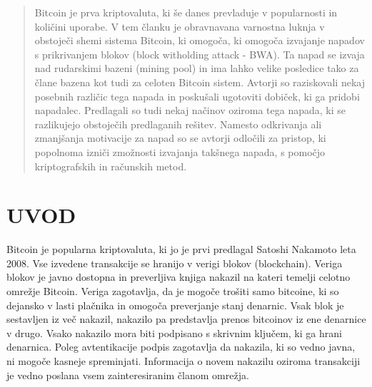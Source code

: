 \documentclass{acm_proc_article-sp}
\begin{document}
	\date{30 July 1999}
	
	\maketitle
\begin{abstract}

Bitcoin je prva kriptovaluta, ki še danes prevladuje v popularnosti in količini uporabe. V tem članku je obravnavana  varnostna luknja v obstoječi shemi sistema Bitcoin, ki omogoča, ki omogoča izvajanje napadov s prikrivanjem blokov (block witholding attack - BWA). Ta napad se izvaja nad rudarskimi bazeni (mining pool) in ima lahko velike posledice tako za člane bazena kot tudi za celoten Bitcoin sistem. Avtorji so raziskovali nekaj posebnih različic tega napada in poskušali ugotoviti dobiček, ki ga pridobi napadalec. Predlagali so tudi nekaj načinov oziroma tega napada, ki se razlikujejo obstoječih predlaganih rešitev.
Namesto odkrivanja ali zmanjšanja motivacije za napad so se avtorji odločili za pristop, ki popolnoma izniči zmožnosti izvajanja takšnega napada, s pomočjo kriptografskih in računskih metod.

\end{abstract}

\section{UVOD} \label{sekcija1}

Bitcoin je popularna kriptovaluta, ki jo je prvi predlagal Satoshi Nakamoto leta 2008. Vse izvedene transakcije se hranijo v verigi blokov (blockchain). Veriga blokov je javno dostopna in preverljiva knjiga nakazil na kateri temelji celotno omrežje Bitcoin. Veriga zagotavlja, da je mogoče trošiti samo bitcoine, ki so dejansko v lasti plačnika in omogoča preverjanje stanj denarnic. Vsak blok je sestavljen iz več nakazil, nakazilo pa predstavlja prenos bitcoinov iz ene denarnice v drugo. Vsako nakazilo mora biti podpisano s skrivnim ključem, ki ga hrani denarnica. Poleg avtentikacije podpis zagotavlja da nakazila, ki so vedno javna, ni mogoče kasneje spreminjati. Informacija o novem nakazilu oziroma transakciji je vedno poslana vsem zainteresiranim članom omrežja.
\end{document}
